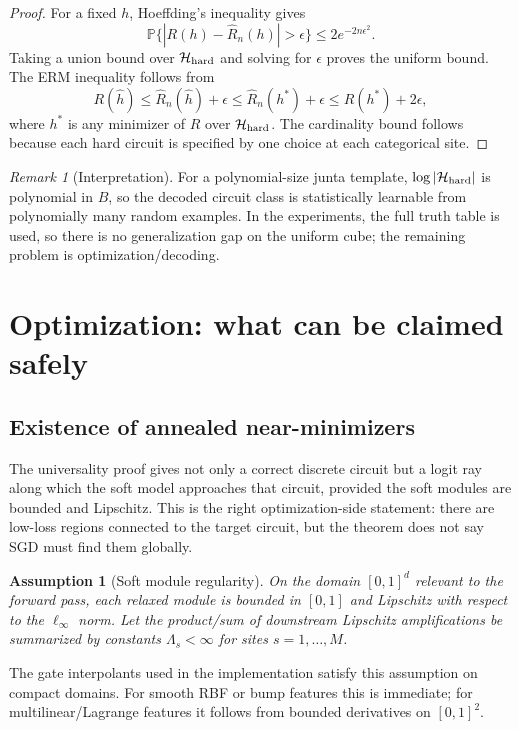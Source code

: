 \documentclass[11pt]{article}
\newtheorem{assumption}[theorem]{Assumption}
\theoremstyle{definition}
\theoremstyle{remark}
\newtheorem{remark}[theorem]{Remark}
\newcommand{\Hcal}{\mathcal H}
\newcommand{\Pbb}{\mathbb P}
\begin{document}
\begin{proof}
For a fixed $h$, Hoeffding's inequality gives
\[
    \Pbb\{|R(h)-\widehat R_n(h)|>\epsilon\}\le 2e^{-2n\epsilon^2}.
\]
Taking a union bound over $\Hcal_{\rm hard}$ and solving for $\epsilon$ proves the uniform bound.  The ERM inequality follows from
\[
R(\widehat h)\le \widehat R_n(\widehat h)+\epsilon
\le \widehat R_n(h^*)+\epsilon
\le R(h^*)+2\epsilon,
\]
where $h^*$ is any minimizer of $R$ over $\Hcal_{\rm hard}$.  The cardinality bound follows because each hard circuit is specified by one choice at each categorical site.
\end{proof}

\begin{remark}[Interpretation]
For a polynomial-size junta template, $\log|\Hcal_{\rm hard}|$ is polynomial in $B$, so the decoded circuit class is statistically learnable from polynomially many random examples.  In the experiments, the full truth table is used, so there is no generalization gap on the uniform cube; the remaining problem is optimization/decoding.
\end{remark}

\section{Optimization: what can be claimed safely}

\subsection{Existence of annealed near-minimizers}

The universality proof gives not only a correct discrete circuit but a logit ray along which the soft model approaches that circuit, provided the soft modules are bounded and Lipschitz.  This is the right optimization-side statement: there are low-loss regions connected to the target circuit, but the theorem does not say SGD must find them globally.

\begin{assumption}[Soft module regularity]
\label{ass:module-regularity}
On the domain $[0,1]^d$ relevant to the forward pass, each relaxed module is bounded in $[0,1]$ and Lipschitz with respect to the $\ell_\infty$ norm.  Let the product/sum of downstream Lipschitz amplifications be summarized by constants $\Lambda_s<\infty$ for sites $s=1,\ldots,M$.
\end{assumption}

The gate interpolants used in the implementation satisfy this assumption on compact domains.  For smooth RBF or bump features this is immediate; for multilinear/Lagrange features it follows from bounded derivatives on $[0,1]^2$.
\end{document}
